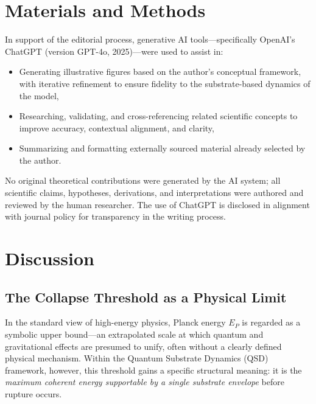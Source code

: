 \documentclass[entropy,article,submit,pdftex,moreauthors]{Definitions/mdpi}
\begin{document}
\section{Materials and Methods}
\qsdmethodstatement

In support of the editorial process, generative AI tools—specifically OpenAI's ChatGPT (version GPT-4o, 2025)—were used to assist in:
\begin{itemize}
    \item Generating illustrative figures based on the author’s conceptual framework, with iterative refinement to ensure fidelity to the substrate-based dynamics of the model,
    \item Researching, validating, and cross-referencing related scientific concepts to improve accuracy, contextual alignment, and clarity,
    \item Summarizing and formatting externally sourced material already selected by the author.
\end{itemize}

No original theoretical contributions were generated by the AI system; all scientific claims, hypotheses, derivations, and interpretations were authored and reviewed by the human researcher. The use of ChatGPT is disclosed in alignment with journal policy for transparency in the writing process.


\section{Discussion}
\subsection{The Collapse Threshold as a Physical Limit}
In the standard view of high-energy physics, Planck energy $E_P$ is regarded as a symbolic upper bound---an extrapolated scale at which quantum and gravitational effects are presumed to unify, often without a clearly defined physical mechanism. Within the Quantum Substrate Dynamics (QSD) framework, however, this threshold gains a specific structural meaning: it is the \textit{maximum coherent energy supportable by a single substrate envelope} before rupture occurs.
\end{document}
